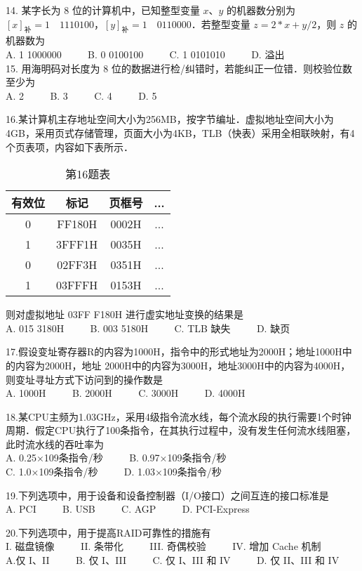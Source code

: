 14.	某字长为 $8$ 位的计算机中，已知整型变量 $x$、$y$ 的机器数分别为 $[x]_\text{补}=1 \quad 1110100$，$[y]_\text{补}=1 \quad 0110000$．若整型变量 $z=2*x+y/2$，则 $z$ 的机器数为 \\
A. 1 1000000 $\qquad$ B. 0 0100100  $\qquad$  C. 1 0101010  $\qquad$  D. 溢出 \\

15.	用海明码对长度为 $8$ 位的数据进行检/纠错时，若能纠正一位错．则校验位数至少为 \\ 
A. 2 $\qquad$ B. 3 $\qquad$ C. 4 $\qquad$ D. 5 

16.某计算机主存地址空间大小为256MB，按字节编址．虚拟地址空间大小为4GB，采用页式存储管理，页面大小为4KB，TLB（快表）采用全相联映射，有4个页表项，内容如下表所示．
\begin{table}[ht]
\centering
\caption{第16题表}\label{CSN13_tab2}
\begin{tabular}{|c|c|c|c|}
\hline
有效位 & 标记 & 页框号 & ... \\
\hline
0 & FF180H & 0002H & ... \\
\hline
1 & 3FFF1H & 0035H & ... \\
\hline
0 & 02FF3H & 0351H & ... \\
\hline
1 & 03FFFH & 0153H & ... \\
\hline
\end{tabular}
\end{table}
则对虚拟地址 03FF F180H 进行虚实地址变换的结果是 \\ 
A. 015 3180H $\qquad$ B. 003 5180H $\qquad$ C. TLB 缺失 $\qquad$ D. 缺页

17.假设变址寄存器R的内容为1000H，指令中的形式地址为2000H；地址1000H中的内容为2000H，地址 2000H中的内容为3000H，地址3000H中的内容为4000H，则变址寻址方式下访问到的操作数是 \\
A. 1000H $\qquad$ B. 2000H $\qquad$ C. 3000H $\qquad$ D. 4000H

18.某CPU主频为1.03GHz，采用4级指令流水线，每个流水段的执行需要1个时钟周期．假定CPU执行了100条指令，在其执行过程中，没有发生任何流水线阻塞，此时流水线的吞吐率为 \\
A. 0.25×109条指令/秒 $\qquad$ B. 0.97×109条指令/秒 \\
C. 1.0×109条指令/秒  $\qquad$ D. 1.03×109条指令/秒

19.下列选项中，用于设备和设备控制器（I/O接口）之间互连的接口标准是 \\
A. PCI  $\qquad$  B. USB  $\qquad$ C. AGP  $\qquad$  D. PCI-Express

20.下列选项中，用于提高RAID可靠性的措施有 \\
I. 磁盘镜像 $\qquad$ II. 条带化 $\qquad$ III. 奇偶校验 $\qquad$ IV. 增加 Cache 机制 \\
A.仅 I、II  $\qquad$  B. 仅 I、III  $\qquad$  C. 仅 I、III 和 IV $\qquad$ D. 仅 II、III 和 IV

